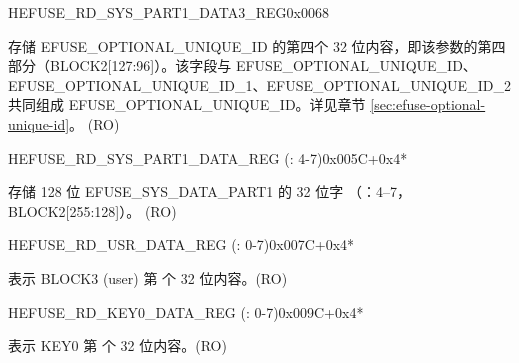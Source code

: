 \begin{register}{H}{EFUSE\_RD\_SYS\_PART1\_DATA3\_REG}{0x0068}\label{regdesc:EFUSERDSYSPART1DATA3REG}
%
\regnewline%
\begin{regdesc}\begin{reglist}
\label{fielddesc:EFUSEOPTIONALUNIQUEID3}\item [EFUSE\_OPTIONAL\_UNIQUE\_ID\_3] 存储 EFUSE\_OPTIONAL\_UNIQUE\_ID 的第四个 32 位内容，即该参数的第四部分（BLOCK2[127:96]）。该字段与 EFUSE\_OPTIONAL\_UNIQUE\_ID、EFUSE\_OPTIONAL\_UNIQUE\_ID\_1、EFUSE\_OPTIONAL\_UNIQUE\_ID\_2 共同组成 EFUSE\_OPTIONAL\_UNIQUE\_ID。详见章节 \ref{sec:efuse-optional-unique-id}。 (RO)
\end{reglist}\end{regdesc}
\end{register}


\begin{register}{H}{EFUSE\_RD\_SYS\_PART1\_DATA\_REG (: 4-7)}{0x005C+0x4*}\label{regdesc:EFUSERDSYSPART1DATA4TO7REG}
%
\regnewline%
\begin{regdesc}\begin{reglist}
\label{fielddesc:EFUSESYSDATAPART1N}\item [EFUSE\_SYS\_DATA\_PART1\_\regindex{n}] 存储 128 位 EFUSE\_SYS\_DATA\_PART1 的 32 位字 （：4–7，BLOCK2[255:128]）。 (RO)
\end{reglist}\end{regdesc}
\end{register}


    \begin{register}{H}{EFUSE\_RD\_USR\_DATA\_REG (: 0-7)}{0x007C+0x4*}\label{regdesc:EFUSERDUSRDATANREG}
    \regnewline%
    \begin{regdesc}\begin{reglist}
    \label{fielddesc:EFUSEUSRDATAN}\item [EFUSE\_USR\_DATA\regindex{n}] 表示 BLOCK3 (user) 第  个 32 位内容。(RO)
    \end{reglist}\end{regdesc}
    \end{register}


    \begin{register}{H}{EFUSE\_RD\_KEY0\_DATA\_REG (: 0-7)}{0x009C+0x4*}\label{regdesc:EFUSERDKEY0DATANREG}
    \regnewline%
    \begin{regdesc}\begin{reglist}
    \label{fielddesc:EFUSEKEY0DATAN}\item [EFUSE\_KEY0\_DATA\regindex{n}] 表示 KEY0 第  个 32 位内容。(RO)
    \end{reglist}\end{regdesc}
    \end{register}


